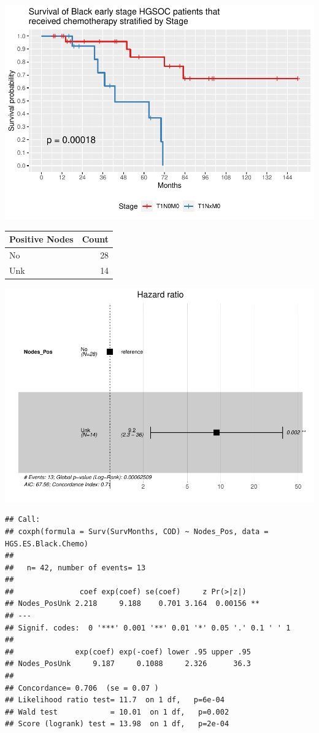 \documentclass[
]{article}
\begin{document}
\includegraphics{EarlyOvaryRace_files/figure-latex/unnamed-chunk-8-1.pdf}

\begin{tabular}[t]{l|r}
\hline
Positive Nodes & Count\\
\hline
No & 28\\
\hline
Unk & 14\\
\hline
\end{tabular}

\includegraphics{EarlyOvaryRace_files/figure-latex/unnamed-chunk-9-1.pdf}

\begin{verbatim}
## Call:
## coxph(formula = Surv(SurvMonths, COD) ~ Nodes_Pos, data = HGS.ES.Black.Chemo)
## 
##   n= 42, number of events= 13 
## 
##               coef exp(coef) se(coef)     z Pr(>|z|)   
## Nodes_PosUnk 2.218     9.188    0.701 3.164  0.00156 **
## ---
## Signif. codes:  0 '***' 0.001 '**' 0.01 '*' 0.05 '.' 0.1 ' ' 1
## 
##              exp(coef) exp(-coef) lower .95 upper .95
## Nodes_PosUnk     9.187     0.1088     2.326      36.3
## 
## Concordance= 0.706  (se = 0.07 )
## Likelihood ratio test= 11.7  on 1 df,   p=6e-04
## Wald test            = 10.01  on 1 df,   p=0.002
## Score (logrank) test = 13.98  on 1 df,   p=2e-04
\end{verbatim}
\end{document}

